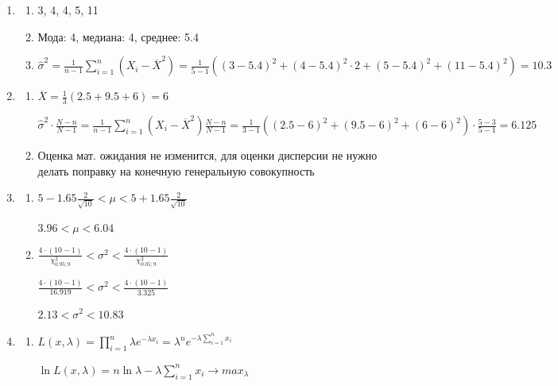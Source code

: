 \documentclass[12pt, a4paper]{article}\usepackage[]{graphicx}\usepackage[]{color}
\begin{document}
\begin{enumerate}
	
	\item
		\begin{enumerate}
			\item 3, 4, 4, 5, 11
			\item Мода: 4, медиана: 4, среднее: 5.4
			\item $\hat{\sigma}^2 = \frac{1}{n-1} \sum_{i=1}^{n} \left(X_i - \overline{X}^2 \right) = \frac{1}{5-1} \left( (3-5.4)^2 + (4-5.4)^2 \cdot 2 + (5-5.4)^2 + (11-5.4)^2 \right) = 10.3 $
		\end{enumerate}
		
	\item 
		\begin{enumerate}
			\item $\overline{X} = \frac{1}{3} (2.5 + 9.5 + 6) = 6$
			
			$\hat{\sigma}^2 \cdot \frac{N-n}{N-1} = \frac{1}{n-1} \sum_{i=1}^{n} \left(X_i - \overline{X}^2 \right) \frac{N-n}{N-1} = \frac{1}{3-1} ( (2.5-6)^2 + (9.5-6)^2 + (6-6)^2 ) \cdot \frac{5-3}{5-1} = 6.125$
			
			\item Оценка мат. ожидания не изменится, для оценки дисперсии не нужно делать поправку на конечную генеральную совокупность
		\end{enumerate}
		
	\item
		\begin{enumerate}
			\item $5 - 1.65 \frac{2}{\sqrt{10}} < \mu < 5 + 1.65 \frac{2}{\sqrt{10}}$
						
					 $ 3.96 < \mu < 6.04$
			\item $\frac{4\cdot(10-1)}{\chi^2_{0.95; 9}} < \sigma^2 < \frac{4\cdot(10-1)}{\chi^2_{0.05; 9}}  $
			
					 $\frac{4\cdot(10-1)}{16.919} < \sigma^2 < \frac{4\cdot(10-1)}{3.325}  $
					 
			        $2.13 < \sigma^2 < 10.83$
		\end{enumerate}
		
	\item 
		\begin{enumerate}
			\item $L(x, \lambda) = \prod_{i=1}^n \lambda e^{-\lambda x_i} = \lambda^n e^{-\lambda \sum_{i=1}^n x_i} $
				
			$\ln L(x, \lambda) = n \ln \lambda - \lambda \sum_{i=1}^n x_i \to max_\lambda $
				

\end{enumerate}
\end{enumerate}
\end{document}
